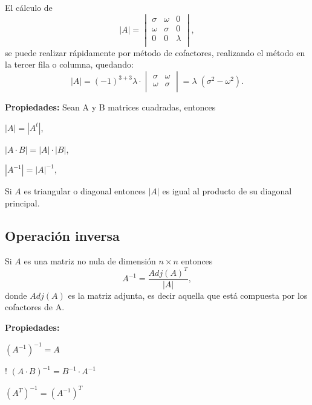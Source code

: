 \begin{example}
    El cálculo de
    \begin{equation*}
        |A| = 
        \begin{vmatrix}
            \sigma & \omega & 0 \\
            \omega & \sigma & 0 \\
            0 & 0 & \lambda \\
        \end{vmatrix},
    \end{equation*}
    se puede realizar rápidamente por método de cofactores, realizando el método en la tercer fila o columna, quedando:
    \begin{equation*}
        |A| = (-1)^{3+3}\lambda \cdot \begin{vmatrix}
            \sigma & \omega \\
            \omega & \sigma \\
        \end{vmatrix} = \lambda \; (\sigma^2 - \omega^2).
    \end{equation*}
\end{example}

\textbf{Propiedades:} Sean A y B matrices cuadradas, entonces

\begin{bangenumerate}
    \item $|A| = |A^t|$,
    \item $|A \cdot B| = |A|\cdot |B|$,
    \item $|A^{-1}| = |A|^{-1}$,
    \item Si $A$ es triangular o diagonal entonces $|A|$ es igual al producto de
    su diagonal principal.
\end{bangenumerate}

\subsection{Operación inversa}
\begin{definition}
    Si $A$ es una matriz no nula de dimensión $n \times n$ entonces
    \begin{equation*}
        A^{-1}  = \frac{Adj(A)^{T}}{|A|},
    \end{equation*}
    donde $Adj(A)$ es la matriz adjunta, es decir aquella que está compuesta por los cofactores de A.
\end{definition}

\textbf{Propiedades:}
\begin{bangenumerate}
    \item $(A^{-1})^{-1} = A$
    \item! $(A\cdot B)^{-1} = B^{-1}\cdot A^{-1}$
    \item $(A^T)^{-1} = (A^{-1})^T$
\end{bangenumerate}

